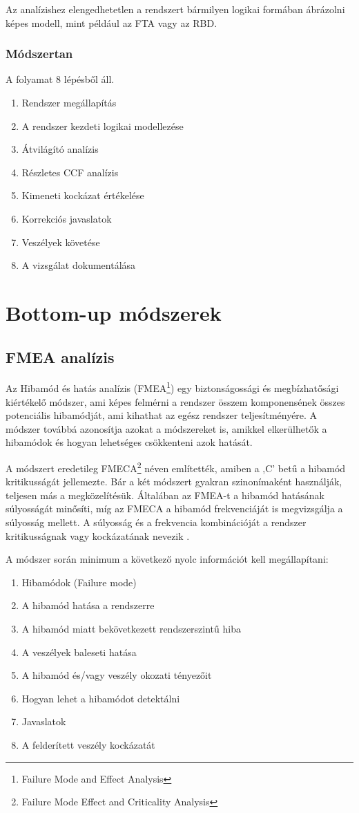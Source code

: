 Az analízishez elengedhetetlen a rendszert bármilyen logikai formában ábrázolni képes modell, mint például az FTA vagy az RBD.

\subsubsection{Módszertan}
A folyamat 8 lépésből áll.
\begin{enumerate}
    \item Rendszer megállapítás
    \item A rendszer kezdeti logikai modellezése
    \item Átvilágító analízis
    \item Részletes CCF analízis
    \item Kimeneti kockázat értékelése
    \item Korrekciós javaslatok
    \item Veszélyek követése
    \item A vizsgálat dokumentálása
\end{enumerate}

\section{Bottom-up módszerek}
\subsection{FMEA analízis}
Az Hibamód és hatás analízis (FMEA\footnote{Failure Mode and Effect Analysis}) egy biztonságossági és megbízhatősági kiértékelő módszer, ami képes felmérni a rendszer összem komponensének összes potenciális hibamódját, ami kihathat az egész rendszer teljesítményére.
A módszer továbbá azonosítja azokat a módszereket is, amikkel elkerülhetők a hibamódok és hogyan lehetséges csökkenteni azok hatását.

A módszert eredetileg FMECA\footnote{Failure Mode Effect and Criticality Analysis} néven említették, amiben a ,C' betű a hibamód kritikusságát jellemezte.
Bár a két módszert gyakran szinonímaként használják, teljesen más a megközelítésük.
Általában az FMEA-t a hibamód hatásának súlyosságát minősíti, míg az FMECA a hibamód frekvenciáját is megvizsgálja a súlyosság mellett.
A súlyosság és a frekvencia kombinációját a rendszer kritikusságnak vagy kockázatának nevezik \cite{MIL-STD-1629A}.

A módszer során minimum a következő nyolc információt kell megállapítani:
\begin{enumerate}
    \item Hibamódok (Failure mode)
    \item A hibamód hatása a rendszerre
    \item A hibamód miatt bekövetkezett rendszerszintű hiba
    \item A veszélyek baleseti hatása
    \item A hibamód és/vagy veszély okozati tényezőit
    \item Hogyan lehet a hibamódot detektálni
    \item Javaslatok
    \item A felderített veszély kockázatát
\end{enumerate}

